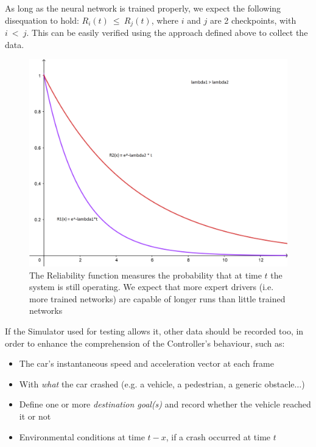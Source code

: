 As long as the neural network is trained properly, we expect the following disequation to hold: $R_{i}(t)\: \leq \: R_{j}(t)$, where $i$ and $j$ are 2 checkpoints, with $i\: <\: j$. This can be easily verified using the approach defined above to collect the data.

\begin{figure}[h!]
	\includegraphics[width=\textwidth]{img/reliability-curve.png}
	\caption{The Reliability function measures the probability that at time $t$ the system is still operating. We expect that more expert drivers (i.e. more trained networks) are capable of longer runs than little trained networks}
\end{figure}

\vspace{0.8cm}

If the Simulator used for testing allows it, other data should be recorded too, in order to enhance the comprehension of the Controller's behaviour, such as:

\begin{itemize}
	\item The car's instantaneous speed and acceleration vector at each frame
	\item With \textsl{what} the car crashed (e.g. a vehicle, a pedestrian, a generic obstacle$\dots$)
	\item Define one or more \textsl{destination goal(s)} and record whether the vehicle reached it or not
	\item Environmental conditions at time $t-x$, if a crash occurred at time $t$ 
\end{itemize}

